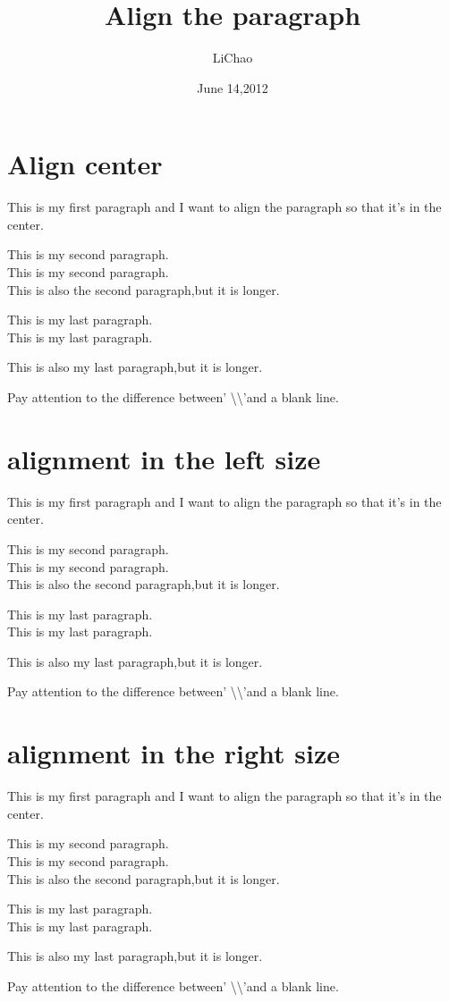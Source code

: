 \documentclass[UTF8]{ctexart}
\title {Align the paragraph}
\author {LiChao}
\date{June 14,2012}
\begin{document}
\maketitle
\part  {Align center}
This is my first paragraph and I want to align the paragraph so that it's in the center.
\begin{center}
This is my second paragraph.\\
This is my second paragraph.\\
This is also the second paragraph,but it is longer.
\end{center}

This is my last paragraph.\\
This is my last paragraph.

This is also my last paragraph,but it is longer.


\Large
Pay attention to the difference between' \textbackslash \textbackslash 'and a blank line.
\normalsize

\part {alignment in the left size}
This is my first paragraph and I want to align the paragraph so that it's in the center.
\begin{flushleft}
This is my second paragraph.\\
This is my second paragraph.\\
This is also the second paragraph,but it is longer.
\end{flushleft}

This is my last paragraph.\\
This is my last paragraph.

This is also my last paragraph,but it is longer.


\Large
Pay attention to the difference between' \textbackslash \textbackslash 'and a blank line.
\normalsize

\part {alignment in the right size}
This is my first paragraph and I want to align the paragraph so that it's in the center.
\begin{flushright}
This is my second paragraph.\\
This is my second paragraph.\\
This is also the second paragraph,but it is longer.
\end{flushright}

This is my last paragraph.\\
This is my last paragraph.

This is also my last paragraph,but it is longer.


\Large
Pay attention to the difference between' \textbackslash \textbackslash 'and a blank line.
\normalsize
\end{document}
